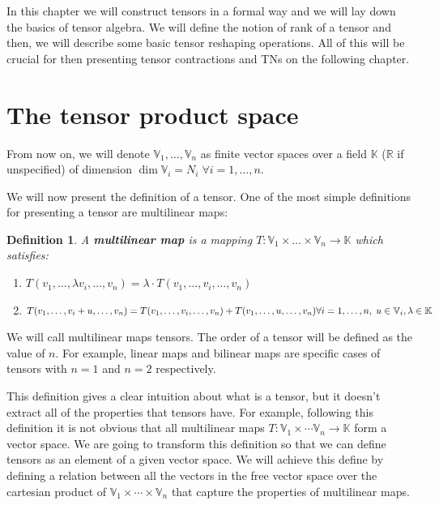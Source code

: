 \documentclass[11pt,a4paper,openright,oneside]{book}
\numberwithin{equation}{section}
\newtheorem{defn0}{Definition}[chapter]
\newenvironment{definition}{ \begin{defn0}}{\end{defn0}}
\begin{document}
\fi


In this chapter we will construct tensors in a formal way and we will lay down the basics of tensor algebra. We will
define the notion of rank of a tensor and then,
we will describe some basic tensor reshaping operations.
All of this will be crucial for then presenting tensor contractions and \gls{TN}s on the following chapter.

\section{The tensor product space}

From now on, we will denote $\mathbb{V}_1, \dots, \mathbb{V}_n$ as finite vector spaces over a field $\mathbb{K}$ ($\mathbb{R}$ if unspecified) of dimension $\dim{\mathbb{V}_i} = N_i \; \forall i = 1, \dots, n$.

We will now present the definition of a tensor. One of the most simple definitions for presenting a tensor
are multilinear maps:

\begin{definition}
    A \textbf{multilinear map} is a mapping ${T: \mathbb{V}_1 \times \dots \times \mathbb{V}_n \rightarrow \mathbb{K}}$ which satisfies:
    \begin{enumerate}
        \item $T(v_1, \dots, \lambda v_i, \dots, v_n) = \lambda \cdot T(v_1, \dots, v_i, \dots, v_n)$
        \item $T(v_1, \dots, v_i + u, \dots, v_n) = T(v_1, \dots, v_i, \dots, v_n) + T(v_1, \dots, u, \dots, v_n) \\ {\forall i = 1, \dots, n, \; u \in \mathbb{V}_i, \lambda \in \mathbb{K}}$
    \end{enumerate}
    \label{def:multilinear-maps}
\end{definition}


We will call multilinear maps tensors. The order of a tensor will be defined as the value of $n$.
For example, linear maps and bilinear maps are specific cases of tensors with $n=1$ and $n=2$ respectively.

This definition gives a clear intuition about what is a tensor, but it doesn't extract all of the properties that tensors have.
For example, following this definition it is not obvious that all multilinear maps $T: \mathbb{V}_1 \times \cdots \mathbb{V}_n \rightarrow \mathbb{K}$
form a vector space. We are going to transform this definition so that we can define tensors
as an element of a given vector space. We will achieve this define by defining a relation between all the vectors in the free vector space
over the cartesian product of $\mathbb{V}_1 \times \cdots \times \mathbb{V}_n$ that capture the properties of multilinear maps.
\end{document}
